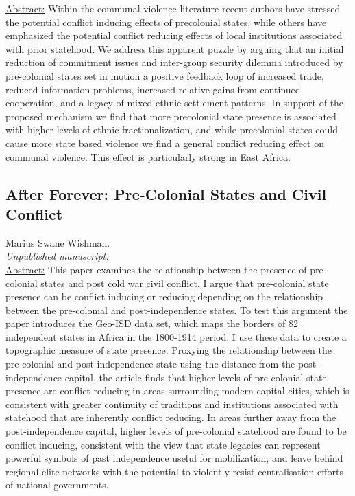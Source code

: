 \documentclass[12pt]{article}
\begin{document}
\underline{Abstract:} Within the communal violence literature recent authors
have stressed the potential conflict inducing effects of precolonial states,
while others have emphasized the potential conflict reducing effects of local
institutions associated with prior statehood. We address this apparent puzzle by
arguing that an initial reduction of commitment issues and inter-group security
dilemma introduced by pre-colonial states set in motion a positive feedback loop
of increased trade, reduced information problems, increased relative gains from
continued cooperation, and a legacy of mixed ethnic settlement patterns. In
support of the proposed mechanism we find that more precolonial state presence
is associated with higher levels of ethnic fractionalization, and while
precolonial states could cause more state based violence we find a general
conflict reducing effect on communal violence. This effect is particularly
strong in East Africa.

\subsection*{After Forever: Pre-Colonial States and Civil Conflict} 

Marius Swane Wishman.\\

\textit{Unpublished manuscript.}\\

\underline{Abstract:} This paper examines the relationship between the presence
of pre-colonial states and post cold war civil conflict. I argue that
pre-colonial state presence can be conflict inducing or reducing depending on
the relationship between the pre-colonial and post-independence states. To test
this argument the paper introduces the Geo-ISD data set, which maps the borders
of 82 independent states in Africa in the 1800-1914 period. I use these data to
create a topographic measure of state presence. Proxying the relationship
between the pre-colonial and post-independence state using the distance from the
post-independence capital, the article finds that higher levels of pre-colonial
state presence are conflict reducing in areas surrounding modern capital cities,
which is consistent with greater continuity of traditions and institutions
associated with statehood that are inherently conflict reducing. In areas
further away from the post-independence capital, higher levels of pre-colonial
statehood are found to be conflict inducing, consistent with the view that state
legacies can represent powerful symbols of past independence useful for
mobilization, and leave behind regional elite networks with the potential to
violently resist centralisation efforts of national governments. 
\end{document}
